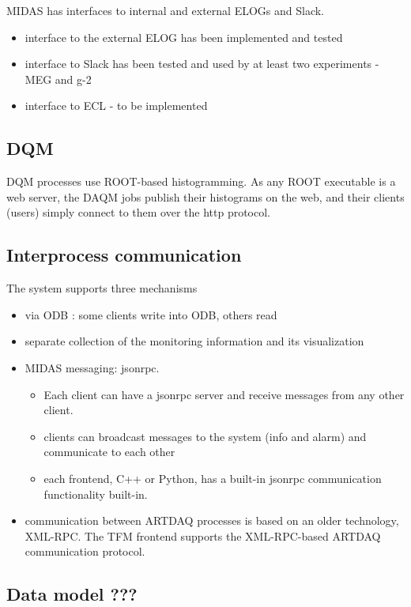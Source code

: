 MIDAS has interfaces to internal and external ELOGs and Slack.
\begin{itemize}
\item
  interface to the external ELOG has been implemented and tested
\item
  interface to Slack has been tested and used by at least two experiments - MEG and g-2
\item
  interface to ECL - to be implemented
\end{itemize}


\subsection{DQM}

DQM processes use ROOT-based histogramming. As any ROOT executable is a web server,
the DAQM jobs publish their histograms on the web, and their clients (users)
simply connect to them over the http protocol.

\subsection{Interprocess communication} 

The system supports three mechanisms
\begin{itemize}
\item
  via ODB : some clients write into ODB, others read
\item
  separate collection of the monitoring information and its visualization
\item
  MIDAS messaging: jsonrpc.
  \begin{itemize}
  \item
    Each client can have a jsonrpc server and receive messages
    from any other client.
  \item
    clients can broadcast messages to the system (info and alarm)
    and communicate to each other
  \item
    each frontend, C++ or Python, has a built-in jsonrpc communication
    functionality built-in.
  \end{itemize}
\item
  communication between ARTDAQ processes is based on an older technology,
  XML-RPC. The TFM frontend supports the XML-RPC-based ARTDAQ communication
  protocol.
\end{itemize}


\subsection{Data model ??? } 




